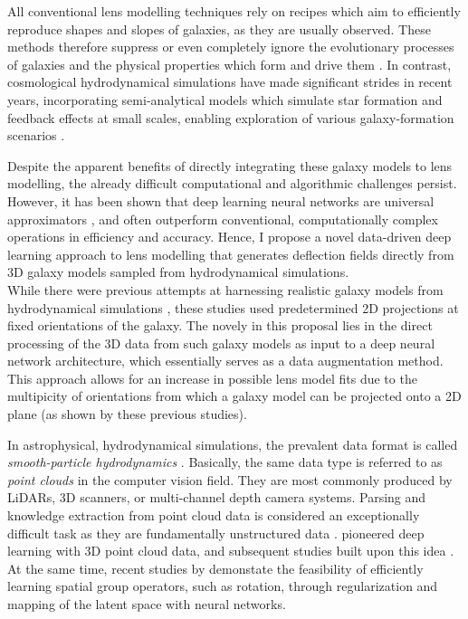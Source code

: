 \documentclass[a4paper,10pt]{article}
\begin{document}
All conventional lens modelling techniques rely on recipes which aim
to efficiently reproduce shapes and slopes of galaxies, as they are
usually observed. These methods therefore suppress or even completely
ignore the evolutionary processes of galaxies and the physical
properties which form and drive them \cite[cf.][]{Naab17}. In contrast,
cosmological hydrodynamical simulations have made significant strides
in recent years, incorporating semi-analytical models which simulate
star formation and feedback effects at small scales, enabling
exploration of various galaxy-formation scenarios
\citep[e.g.][]{Pillepich17,Vogelsberger14}.

Despite the apparent benefits of directly integrating these galaxy
models to lens modelling, the already difficult computational and
algorithmic challenges persist. However, it has been shown that deep
learning neural networks are universal approximators
\citep{Hornik89,Kratsios20}, and often outperform conventional,
computationally complex operations in efficiency and accuracy. Hence,
I propose a novel data-driven deep learning approach to lens modelling
that generates deflection fields directly from 3D galaxy models
sampled from hydrodynamical simulations. \\[0pt]
While there were previous attempts at harnessing realistic galaxy
models from hydrodynamical simulations \citep[see][]{Adam22,Denzel21},
these studies used predetermined 2D projections at fixed orientations
of the galaxy. The novely in this proposal lies in the direct
processing of the 3D data from such galaxy models as input to a deep
neural network architecture, which essentially serves as a data
augmentation method. This approach allows for an increase in possible
lens model fits due to the multipicity of orientations from which a
galaxy model can be projected onto a 2D plane (as shown by these
previous studies).

In astrophysical, hydrodynamical simulations, the prevalent data
format is called \emph{smooth-particle hydrodynamics}
\citep{Gingold77,Lucy77,Monaghan92}. Basically, the same data
type is referred to as \emph{point clouds} in the computer vision
field. They are most commonly produced by LiDARs, 3D scanners, or
multi-channel depth camera systems. Parsing and knowledge extraction
from point cloud data is considered an exceptionally difficult task as
they are fundamentally unstructured data
\citep[cf.][]{Vinyals2015,Armeni16,Rufus20,Zhang15,Nuechter07,Rusinkiewicz00}.
\cite{Qi16} pioneered deep learning with 3D point cloud data, and
subsequent studies built upon this idea
\citep[see][]{Qi17,BenShabat17,Klokov17,Kaul21,AbadRocamora22}. \\[0pt]
At the same time, recent studies by \cite{Quessard20,Keurti22}
demonstate the feasibility of efficiently learning spatial group
operators, such as rotation, through regularization and mapping of the
latent space with neural networks.
\end{document}
